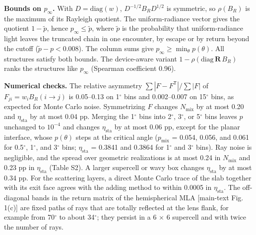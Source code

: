 \documentclass[10pt]{article}
\begin{document}
\textbf{Bounds on $p_\infty$.} With $D = \mathrm{diag}(w)$, $D^{-1/2}B_R D^{1/2}$ is symmetric, so $\rho(B_R)$ is the maximum of its Rayleigh quotient. The uniform-radiance vector gives the quotient $1-\tilde p$, hence $p_\infty \le \tilde p$, where $\tilde p$ is the probability that uniform-radiance light leaves the truncated chain in one encounter, by escape or by return beyond the cutoff ($\tilde p - p < 0.008$). The column sums give $p_\infty \ge \min_\theta p(\theta)$. All structures satisfy both bounds. The device-aware variant $1-\rho(\mathrm{diag}\,\mathbf{R}\,B_R)$ ranks the structures like $p_\infty$ (Spearman coefficient 0.96).

\textbf{Numerical checks.} The relative asymmetry $\sum|F-F^{\mathsf T}|/\sum|F|$ of $F_{ji} = w_i B_R(i\to j)$ is 0.05–0.13 on 1\ensuremath{^\circ} bins and 0.002–0.007 on 15\ensuremath{^\circ} bins, as expected for Monte Carlo noise. Symmetrizing $F$ changes $N_{\mathrm{mix}}$ by at most 0.20 and $\eta_{\mathrm{sta}}$ by at most 0.04 pp. Merging the 1\ensuremath{^\circ} bins into 2\ensuremath{^\circ}, 3\ensuremath{^\circ}, or 5\ensuremath{^\circ} bins leaves $p$ unchanged to $10^{-4}$ and changes $\eta_{\mathrm{sta}}$ by at most 0.06 pp, except for the planar interface, whose $p(\theta)$ steps at the critical angle ($p_{\mathrm{mix}}$ = 0.054, 0.056, and 0.061 for 0.5\ensuremath{^\circ}, 1\ensuremath{^\circ}, and 3\ensuremath{^\circ} bins; $\eta_{\mathrm{sta}}$ = 0.3841 and 0.3864 for 1\ensuremath{^\circ} and 3\ensuremath{^\circ} bins). Ray noise is negligible, and the spread over geometric realizations is at most 0.24 in $N_{\mathrm{mix}}$ and 0.23 pp in $\eta_{\mathrm{sta}}$ (Table S2). A larger supercell or wavy box changes $\eta_{\mathrm{sta}}$ by at most 0.34 pp. For the scattering layers, a direct Monte Carlo trace of the slab together with its exit face agrees with the adding method to within 0.0005 in $\eta_{\mathrm{sta}}$. The off-diagonal bands in the return matrix of the hemispherical MLA [main-text Fig. 1(c)] are fixed paths of rays that are totally reflected at the lens flank, for example from 70\ensuremath{^\circ} to about 34\ensuremath{^\circ}; they persist in a 6 \ensuremath{\times} 6 supercell and with twice the number of rays.
\end{document}
